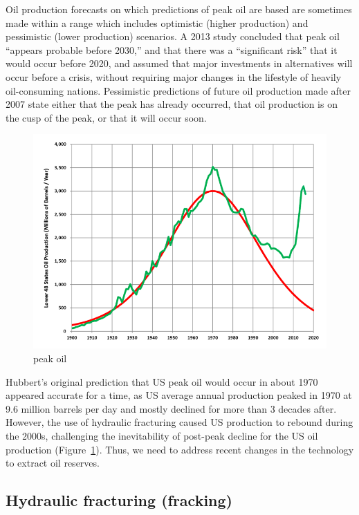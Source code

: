 Oil production forecasts on which predictions of peak oil are based are sometimes made within a range which includes optimistic (higher production) and pessimistic (lower production) scenarios. A 2013 study concluded that peak oil ``appears probable before 2030,'' and that there was a ``significant risk'' that it would occur before 2020, and assumed that major investments in alternatives will occur before a crisis, without requiring major changes in the lifestyle of heavily oil-consuming nations. Pessimistic predictions of future oil production made after 2007 state either that the peak has already occurred, that oil production is on the cusp of the peak, or that it will occur soon.

\begin{figure}[b]
	\centering
		\includegraphics[width=1.00\textwidth]{graphics/Hubbert_Upper-Bound_Peak_1956.png}
	\caption{peak oil}
	\label{fig:Hubbert_Upper-Bound_Peak_1956}
\end{figure}

Hubbert's original prediction that US peak oil would occur in about 1970 appeared accurate for a time, as US average annual production peaked in 1970 at 9.6 million barrels per day and mostly declined for more than 3 decades after. However, the use of hydraulic fracturing caused US production to rebound during the 2000s, challenging the inevitability of post-peak decline for the US oil production (Figure~\ref{fig:Hubbert_Upper-Bound_Peak_1956}). Thus, we need to address recent changes in the technology to extract oil reserves.

\subsection{Hydraulic fracturing (fracking)} 


